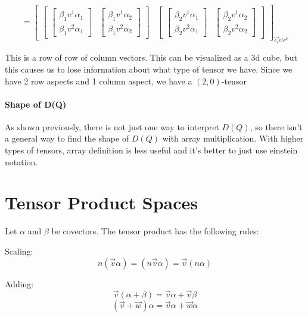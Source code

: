 \documentclass{report}
\begin{document}
$$ =\begin{bmatrix}  \begin{bmatrix} \begin{bmatrix} \beta_1 v^1 \alpha_1 \\ \beta_1 v^2 \alpha_1  \end{bmatrix} & \begin{bmatrix} \beta_1 v^1\alpha_2 \\ \beta_1 v^2 \alpha_2 \end{bmatrix}  \end{bmatrix} & \begin{bmatrix} \begin{bmatrix} \beta_2 v^1 \alpha_1 \\ \beta_2 v^2 \alpha_1  \end{bmatrix} & \begin{bmatrix} \beta_2 v^1\alpha_2 \\ \beta_2 v^2 \alpha_2 \end{bmatrix}  \end{bmatrix}  \end{bmatrix}_{\vec{e_i}\epsilon^j\epsilon^k} $$ 

This is a row of row of column vectors. This can be visualized as a 3d cube, but this causes us to lose information about what type of tensor we have. Since we have 2 row aspects and 1 column aspect, we have a $\left(2, 0  \right)$-tensor

\subsubsection{Shape of D(Q)}
As shown previously, there is not just one way to interpret $D(Q)$, so there isn't a general way to find the shape of $D(Q)$ with array multiplication. With higher types of tensors, array definition is less useful and it's better to just use einstein notation.

\chapter{Tensor Product Spaces}
Let $\alpha$ and $\beta$ be covectors. The tensor product has the following rules:

Scaling:
$$ n\left( \vec{v}\alpha \right) = \left( n \vec{v}\alpha \right) = \vec{v}\left( n \alpha \right) $$ 

Adding:
$$ \vec{v}\left( \alpha + \beta \right) = \vec{v} \alpha  + \vec{v} \beta$$
$$ \left(\vec{v} + \vec{w}\right) \alpha = \vec{v} \alpha + \vec{w} \alpha$$
\end{document}
